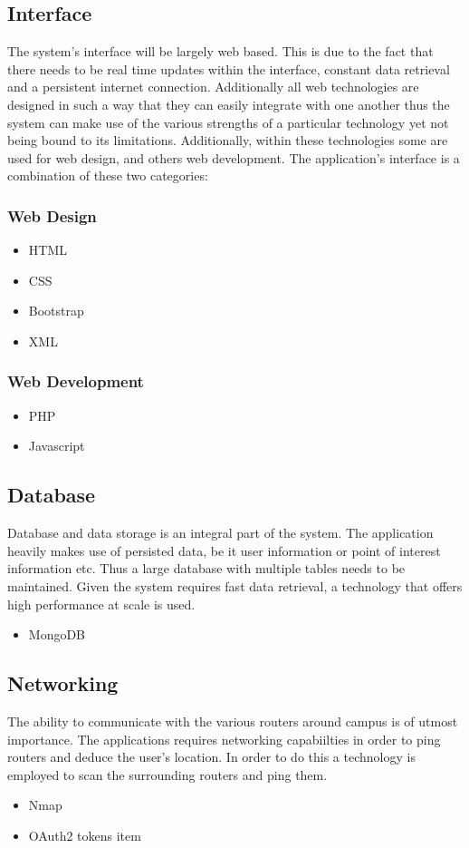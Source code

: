 \documentclass{article}
\begin{document}
	\subsection{Interface}
The system's interface will be largely web based. This is due to the fact that there needs to be real time updates within the interface, constant data retrieval and a persistent internet connection.  Additionally all web technologies are designed in such a way that they can easily integrate with one another thus the system can make use of the various strengths of a particular technology yet not being bound to its limitations.  Additionally, within these technologies some are used for web design, and others web development.  The application's interface is a combination of these two categories:
		\subsubsection{Web Design}
			\begin{itemize}
				\item HTML
				\item CSS
				\item Bootstrap
				\item XML
			\end{itemize}
		\subsubsection{Web Development}
			\begin{itemize}
				\item PHP
				\item Javascript
			\end{itemize}
	\subsection{Database}
Database and data storage is an integral part of the system.  The application heavily makes use of persisted data, be it user information or point of interest information etc.  Thus a large database with multiple tables needs to be maintained.  Given the system requires fast data retrieval, a technology that offers high performance at scale is used.
		\begin{itemize}
			\item MongoDB
		\end{itemize}
	\subsection{Networking}	
The ability to communicate with the various routers around campus is of utmost importance.  The applications requires networking capabiilties in order to ping routers and deduce the user's location.  In order to do this a technology is employed to scan the surrounding routers and ping them.
		\begin{itemize}
			\item Nmap
			\item OAuth2 tokens
item
		\end{itemize}
\end{document}

